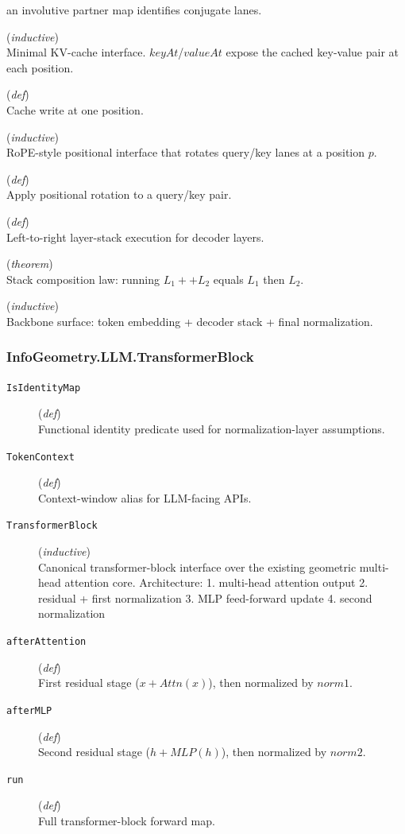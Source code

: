 \documentclass[11pt,a4paper]{article}
\begin{document}
\begin{description}
an involutive partner map identifies conjugate lanes.
  \item[\texttt{KVCache}] (\textit{inductive}) \\ Minimal KV-cache interface. 
$keyAt$/$valueAt$ expose the cached key-value pair at each position.
  \item[\texttt{write}] (\textit{def}) \\ Cache write at one position.
  \item[\texttt{RotaryPositionalLayer}] (\textit{inductive}) \\ RoPE-style positional interface that rotates query/key lanes at a position $p$.
  \item[\texttt{rotatePair}] (\textit{def}) \\ Apply positional rotation to a query/key pair.
  \item[\texttt{runDecoderStack}] (\textit{def}) \\ Left-to-right layer-stack execution for decoder layers.
  \item[\texttt{runDecoderStack\_append}] (\textit{theorem}) \\ Stack composition law: running $L_1  ++ L_2 $ equals $L_1 $ then $L_2 $.
  \item[\texttt{TransformerBackbone}] (\textit{inductive}) \\ Backbone surface: token embedding + decoder stack + final normalization.
\end{description}
\subsubsection*{InfoGeometry.LLM.TransformerBlock}
\begin{description}
  \item[\texttt{IsIdentityMap}] (\textit{def}) \\ Functional identity predicate used for normalization-layer assumptions.
  \item[\texttt{TokenContext}] (\textit{def}) \\ Context-window alias for LLM-facing APIs.
  \item[\texttt{TransformerBlock}] (\textit{inductive}) \\ Canonical transformer-block interface over the existing geometric multi-head attention core. 
Architecture: 
1. multi-head attention output 
2. residual + first normalization 
3. MLP feed-forward update 
4. second normalization
  \item[\texttt{afterAttention}] (\textit{def}) \\ First residual stage ($x + Attn(x)$), then normalized by $norm1$.
  \item[\texttt{afterMLP}] (\textit{def}) \\ Second residual stage ($h + MLP(h)$), then normalized by $norm2$.
  \item[\texttt{run}] (\textit{def}) \\ Full transformer-block forward map.
\end{description}
\end{document}
